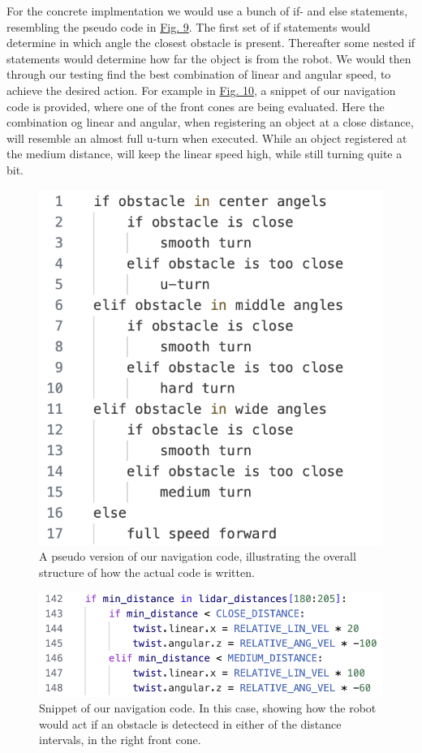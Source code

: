 \documentclass[conference]{IEEEtran}
\begin{document}
For the concrete implmentation we would use a bunch of if- and else statements, resembling the pseudo code in \href{sec:pseudo}{Fig. 9}.
The first set of if statements would determine in which angle the closest obstacle is present.
Thereafter some nested if statements would determine how far the object is from the robot.
We would then through our testing find the best combination of linear and angular speed, to achieve the desired action.
For example in \href{sec:navigation}{Fig. 10}, a snippet of our navigation code is provided, where one of the front cones are being evaluated. 
Here the combination og linear and angular, when registering an object at a close distance, will resemble an almost full u-turn when executed.
While an object registered at the medium distance, will keep the linear speed high, while still turning quite a bit.

\begin{figure}[htbp]
    \centerline{\includegraphics[width=0.75\columnwidth\hspace{-0.5cm}]{Pictures/Pseudo.png}}
    \caption{A pseudo version of our navigation code, illustrating the overall structure of how the actual code is written.}
    \label{sec:pseudo}
    \end{figure}
\begin{figure}[htbp]
    \centerline{\includegraphics[width=1.0\columnwidth\hspace{0.0cm}]{Pictures/Navigation.png}}
    \caption{Snippet of our navigation code. 
    In this case, showing how the robot would act if an obstacle is detectecd in either of the distance intervals, in the right front cone.}
    \label{sec:navigation}
    \end{figure}
\end{document}
